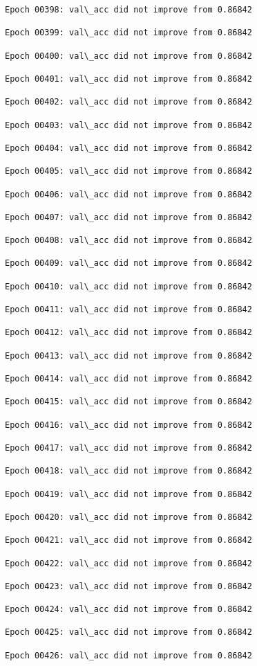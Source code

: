\documentclass[11pt]{article}
\begin{document}
\begin{Verbatim}[commandchars=\\\{\}]
Epoch 00398: val\_acc did not improve from 0.86842

Epoch 00399: val\_acc did not improve from 0.86842

Epoch 00400: val\_acc did not improve from 0.86842

Epoch 00401: val\_acc did not improve from 0.86842

Epoch 00402: val\_acc did not improve from 0.86842

Epoch 00403: val\_acc did not improve from 0.86842

Epoch 00404: val\_acc did not improve from 0.86842

Epoch 00405: val\_acc did not improve from 0.86842

Epoch 00406: val\_acc did not improve from 0.86842

Epoch 00407: val\_acc did not improve from 0.86842

Epoch 00408: val\_acc did not improve from 0.86842

Epoch 00409: val\_acc did not improve from 0.86842

Epoch 00410: val\_acc did not improve from 0.86842

Epoch 00411: val\_acc did not improve from 0.86842

Epoch 00412: val\_acc did not improve from 0.86842

Epoch 00413: val\_acc did not improve from 0.86842

Epoch 00414: val\_acc did not improve from 0.86842

Epoch 00415: val\_acc did not improve from 0.86842

Epoch 00416: val\_acc did not improve from 0.86842

Epoch 00417: val\_acc did not improve from 0.86842

Epoch 00418: val\_acc did not improve from 0.86842

Epoch 00419: val\_acc did not improve from 0.86842

Epoch 00420: val\_acc did not improve from 0.86842

Epoch 00421: val\_acc did not improve from 0.86842

Epoch 00422: val\_acc did not improve from 0.86842

Epoch 00423: val\_acc did not improve from 0.86842

Epoch 00424: val\_acc did not improve from 0.86842

Epoch 00425: val\_acc did not improve from 0.86842

Epoch 00426: val\_acc did not improve from 0.86842


\end{Verbatim}
\end{document}
